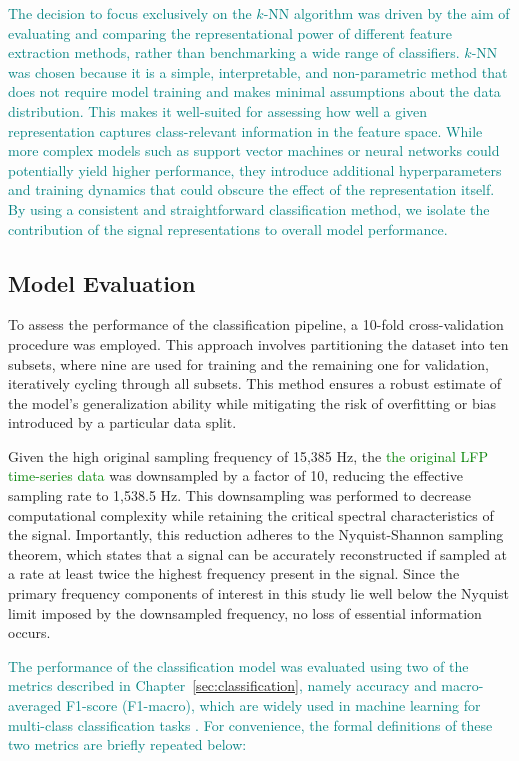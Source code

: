 \documentclass{article}
\begin{document}
\textcolor{teal}{The decision to focus exclusively on the $k$-NN algorithm was driven by the aim of evaluating and comparing the representational power of different feature extraction methods, rather than benchmarking a wide range of classifiers. $k$-NN was chosen because it is a simple, interpretable, and non-parametric method that does not require model training and makes minimal assumptions about the data distribution. This makes it well-suited for assessing how well a given representation captures class-relevant information in the feature space. While more complex models such as support vector machines or neural networks could potentially yield higher performance, they introduce additional hyperparameters and training dynamics that could obscure the effect of the representation itself. By using a consistent and straightforward classification method, we isolate the contribution of the signal representations to overall model performance.}

\subsection{Model Evaluation} \label{sec:evaluation}
To assess the performance of the classification pipeline, a 10-fold cross-validation procedure was employed. This approach involves partitioning the dataset into ten subsets, where nine are used for training and the remaining one for validation, iteratively cycling through all subsets. This method ensures a robust estimate of the model’s generalization ability while mitigating the risk of overfitting or bias introduced by a particular data split.

Given the high original sampling frequency of 15,385 Hz, the \textcolor{green}{the original LFP time-series data} was downsampled by a factor of 10, reducing the effective sampling rate to 1,538.5 Hz. This downsampling was performed to decrease computational complexity while retaining the critical spectral characteristics of the signal. Importantly, this reduction adheres to the Nyquist-Shannon sampling theorem, which states that a signal can be accurately reconstructed if sampled at a rate at least twice the highest frequency present in the signal. Since the primary frequency components of interest in this study lie well below the Nyquist limit imposed by the downsampled frequency, no loss of essential information occurs.

\textcolor{teal}{The performance of the classification model was evaluated using two of the metrics described in Chapter~\ref{sec:classification}, namely accuracy and macro-averaged F1-score (F1-macro), which are widely used in machine learning for multi-class classification tasks \cite{sokolova2009}. For convenience, the formal definitions of these two metrics are briefly repeated below:}
\end{document}
